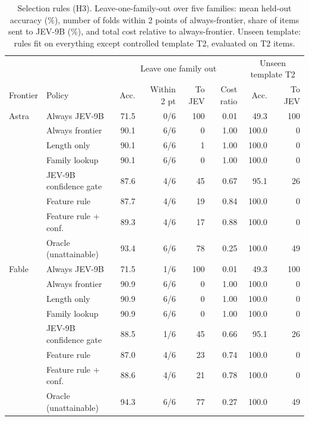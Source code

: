 \begin{table}[t]
\centering\small
\caption{Selection rules (H3). Leave-one-family-out over five families: mean held-out accuracy (\%), number of folds within 2 points of always-frontier, share of items sent to JEV-9B (\%), and total cost relative to always-frontier. Unseen template: rules fit on everything except controlled template T2, evaluated on T2 items.}
\label{tab:routing}
\begin{tabular}{@{}llrrrrrr@{}}
\toprule
& & \multicolumn{4}{c}{Leave one family out} & \multicolumn{2}{c}{Unseen template T2} \\
Frontier & Policy & Acc. & Within 2 pt & To JEV & Cost ratio & Acc. & To JEV \\
\midrule
Astra & Always JEV-9B & 71.5 & 0/6 & 100 & 0.01 & 49.3 & 100 \\
 & Always frontier & 90.1 & 6/6 & 0 & 1.00 & 100.0 & 0 \\
 & Length only & 90.1 & 6/6 & 1 & 1.00 & 100.0 & 0 \\
 & Family lookup & 90.1 & 6/6 & 0 & 1.00 & 100.0 & 0 \\
 & JEV-9B confidence gate & 87.6 & 4/6 & 45 & 0.67 & 95.1 & 26 \\
 & Feature rule & 87.7 & 4/6 & 19 & 0.84 & 100.0 & 0 \\
 & Feature rule + conf. & 89.3 & 4/6 & 17 & 0.88 & 100.0 & 0 \\
 & Oracle (unattainable) & 93.4 & 6/6 & 78 & 0.25 & 100.0 & 49 \\
\midrule
Fable & Always JEV-9B & 71.5 & 1/6 & 100 & 0.01 & 49.3 & 100 \\
 & Always frontier & 90.9 & 6/6 & 0 & 1.00 & 100.0 & 0 \\
 & Length only & 90.9 & 6/6 & 0 & 1.00 & 100.0 & 0 \\
 & Family lookup & 90.9 & 6/6 & 0 & 1.00 & 100.0 & 0 \\
 & JEV-9B confidence gate & 88.5 & 1/6 & 45 & 0.66 & 95.1 & 26 \\
 & Feature rule & 87.0 & 4/6 & 23 & 0.74 & 100.0 & 0 \\
 & Feature rule + conf. & 88.6 & 4/6 & 21 & 0.78 & 100.0 & 0 \\
 & Oracle (unattainable) & 94.3 & 6/6 & 77 & 0.27 & 100.0 & 49 \\
\bottomrule
\end{tabular}
\end{table}
